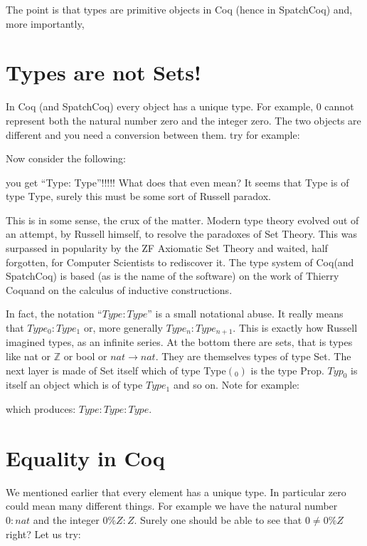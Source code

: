 The point is that types are primitive objects in Coq (hence in SpatchCoq) and, more importantly, 
\section{ Types are not Sets!}

In Coq (and SpatchCoq) every object has a unique type. For example, 0 cannot represent both the natural number zero and the integer zero. The two objects are different and you need a conversion between them. try for example:




Now consider the following:


you get ``Type: Type''!!!!! What does that even mean? It seems that Type is of type Type, surely this must be some sort of Russell paradox.

This is in some sense, the crux of the matter. Modern type theory evolved out of an attempt, 
by Russell himself, to resolve the paradoxes of Set Theory. This was surpassed in popularity by the ZF Axiomatic Set Theory and waited, half forgotten, for Computer Scientists to rediscover it. The type system of Coq(and SpatchCoq) is based (as is the name of the software) on the work of Thierry Coquand on  the calculus of inductive constructions.

In fact, the notation ``$Type : Type$'' is a small notational abuse. It really means that $Type_{0} : Type_{1}$ or, more generally $Type_{n} : Type_{n+1}$. This is exactly how Russell imagined types,  as an infinite series. At the bottom there are sets, that is types like nat or $\mathbb{Z}$ or bool or $nat \rightarrow nat$. They are themselves types of type Set. The next layer is made of Set itself which of type Type$(_{0})$ is the type Prop. $Typ_{0}$ is itself an object which is of type $Type_{1}$ and so on. Note for example:

 which produces:
$Type : Type
     : Type$.
     
     
 \section{Equality in Coq}    
 
 We mentioned earlier that every element has a unique type. In particular zero could mean many different things. For example we have the natural number $0:nat$ and the  integer $0\%Z:Z$. Surely one should be able to see that $0\ne 0\%Z$ right? Let us try:
 

